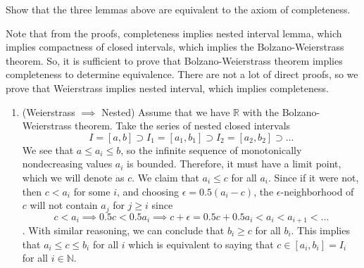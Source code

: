 \documentclass{article}
\begin{document}
    \begin{exercise}[Zorich 2.3.4]
    Show that the three lemmas above are equivalent to the axiom of completeness. 
    \end{exercise}

    \begin{solution}
    Note that from the proofs, completeness implies nested interval lemma, which implies compactness of closed intervals, which implies the Bolzano-Weierstrass theorem. So, it is sufficient to prove that Bolzano-Weierstrass theorem implies completeness to determine equivalence. There are not a lot of direct proofs, so we prove that Weierstrass implies nested interval, which implies completeness. 
    \begin{enumerate}
        \item (Weierstrass $\implies$ Nested) Assume that we have $\mathbb{R}$ with the Bolzano-Weierstrass theorem. Take the series of nested closed intervals 
        \[I = [a, b] \supset I_1 = [a_1, b_1] \supset I_2 = [a_2, b_2] \supset \ldots\]
        We see that $a \leq a_i \leq b$, so the infinite sequence of monotonically nondecreasing values $a_i$ is bounded. Therefore, it must have a limit point, which we will denote as $c$. We claim that $a_i \leq c$ for all $a_i$. Since if it were not, then $c < a_i$ for some $i$, and choosing $\epsilon = 0.5 (a_i - c)$, the $\epsilon$-neighborhood of $c$ will not contain $a_j$ for $j \geq i$ since 
        \[c < a_i \implies 0.5 c < 0.5 a_i \implies c + \epsilon = 0.5c + 0.5 a_i < a_i< a_{i+1} < \ldots\]. 
        With similar reasoning, we can conclude that $b_i \geq c$ for all $b_i$. This implies that $a_i \leq c \leq b_i$ for all $i$ which is equivalent to saying that $c \in [a_i, b_i] = I_i$ for all $i \in \mathbb{N}$. 
        

\end{enumerate}
\end{solution}
\end{document}
